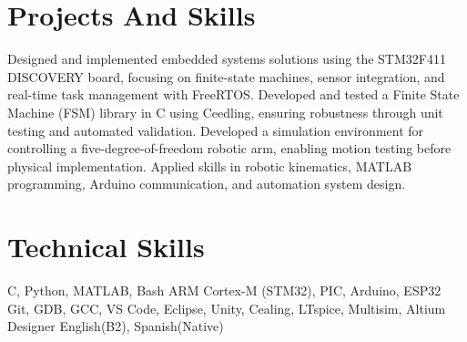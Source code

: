 \section{Projects And Skills}
  \resumeSubHeadingListStart
      {Designed and implemented embedded systems solutions using the STM32F411 DISCOVERY board, focusing on finite-state machines, sensor integration, and real-time task management with FreeRTOS.}
      {Developed and tested a Finite State Machine (FSM) library in C using Ceedling, ensuring robustness through unit testing and automated validation.}
      {Developed a simulation environment for controlling a five-degree-of-freedom robotic arm, enabling motion testing before physical implementation. Applied skills in robotic kinematics, MATLAB programming, Arduino communication, and automation system design.}
  \resumeSubHeadingListEnd

\smallskip

\section{Technical Skills}
  \smallskip
  \resumeSubHeadingListStart
      {C, Python, MATLAB, Bash}
    \smallskip
      {ARM Cortex-M (STM32), PIC, Arduino, ESP32}
    \smallskip
      {Git, GDB, GCC, VS Code, Eclipse, Unity, Cealing, LTspice, Multisim, Altium Designer}
    \smallskip
      {English(B2), Spanish(Native)}
  \resumeSubHeadingListEnd

